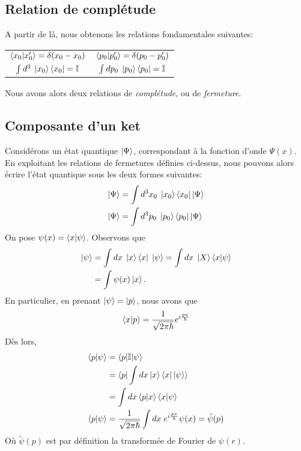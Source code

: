 \documentclass[../Notesdecours.tex]{subfiles}
\begin{document}
\subsection{Relation de complétude} \label{complétude}
A partir de là, nous obtenons les relations fondamentales suivantes:
\begin{center}
\begin{tabular}{c|c}
$\braket{x_0|x_0'} = \delta (x_0 - x_0)$ & $\braket{p_0|p_0'} = \delta (p_0-p_0')$\\
$\int d^3 \; \ket{x_0}\bra{x_0} = \mathbb{I}$ & $\int dp_0 \; \ket{p_0}\bra{p_0} = \mathbb{I}$
\end{tabular}
\end{center}
Nous avons alors deux relations de \emph{complétude}, ou de \emph{fermeture}.

\subsection{Composante d'un ket}
Considérons un état quantique $\ket{\Psi}$, correspondant à la fonction d'onde $\Psi(x)$. En exploitant les relations de fermetures définies ci-dessus, nous pouvons alors écrire l'état quantique sous les deux formes suivantes:
\begin{align}
\ket{\Psi} &= \int d^3x_0 \; \ket{x_0} \bra{x_0} \ket{\Psi}\\
\ket{\Psi} &= \int d^3p_0 \; \ket{p_0} \bra{p_0} \ket{\Psi}
\end{align}
On pose $\psi(x) = \braket{x|\psi}$. Observons que
\begin{align}
\ket{\psi} &= \int dx \; \ket{x}\bra{x} \; \ket{\psi} = \int dx \; \ket{X} \braket{x|\psi}\\
&= \int \psi(x)\ket{x}.
\end{align}
En particulier, en prenant $\ket{\psi} = \ket{p}$, nous avons que
\begin{equation}
\braket{x|p} = \frac{1}{\sqrt{2\pi\hbar}}e^{i \frac{px}{\hbar}}
\end{equation}
Dès lors, 
\begin{align}
\braket{p|\psi} &= \braket{p|\mathbb{I}|\psi}\notag\\
&= \braket{p|\int dx \ket{x}\bra{x} \ket{\psi}}\notag\\
&= \int dx \braket{p|x}\braket{x|\psi}\notag\\
\braket{p|\psi} &= \frac{1}{\sqrt{2\pi\hbar}}\int dx \; e^{i \frac{px}{\hbar}}\psi(x) = \tilde{\psi}(p)
\end{align}
Où $\tilde{\psi}(p)$ est par définition la transformée de Fourier de $\psi(r)$.\\
\end{document}
